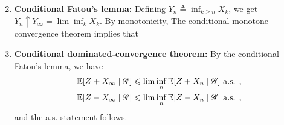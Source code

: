 \documentclass[12pt,aspectratio=169]{beamer}
\begin{document}
\begin{frame}
\begin{Proof}
\begin{enumerate}
\setcounter{enumi}{1}
\item \textbf{Conditional Fatou's lemma:} 
Defining $Y_n \triangleq \inf_{k\ge n} X_k$, we get $Y_n \uparrow Y_\infty = \lim\inf_k X_k$. 
By monotonicity,
The conditional monotone-convergence theorem implies that
\end{enumerate}
\end{Proof}
\end{frame}

\begin{frame}
\begin{Proof}
\begin{enumerate}
\setcounter{enumi}{2}
\item \textbf{Conditional dominated-convergence theorem:}
By the conditional Fatou's lemma, we have
\begin{align*}
\mathbb{E}[Z + X_\infty\mid \mathscr{G}] \leqslant \lim\inf_n\mathbb{E}[Z + X_n\mid \mathscr{G}]\text{ a.s. }, \\
\mathbb{E}[Z - X_\infty\mid \mathscr{G}] \leqslant \lim\inf_n\mathbb{E}[Z - X_n\mid \mathscr{G}] \text{ a.s. },
\end{align*}
and the a.s.-statement follows.
\end{enumerate}
\end{Proof}
\end{frame}
\end{document}
